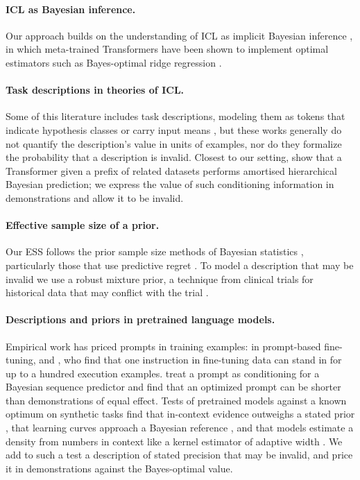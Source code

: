\documentclass[10pt]{article}
\begin{document}
\paragraph{ICL as Bayesian inference.} Our approach builds on the understanding of ICL as implicit Bayesian inference \citep{xie2022}, in which meta-trained Transformers have been shown to implement optimal estimators such as Bayes-optimal ridge regression \citep{akyurek2023, raventos2023, panwar2024}.

\paragraph{Task descriptions in theories of ICL.} Some of this literature includes task descriptions, modeling them as tokens that indicate hypothesis classes or carry input means \citep{huangge2025, lin2025, tong2026, lin2024}, but these works generally do not quantify the description's value in units of examples, nor do they formalize the probability that a description is invalid. Closest to our setting, \citet{zhu2026} show that a Transformer given a prefix of related datasets performs amortised hierarchical Bayesian prediction; we express the value of such conditioning information in demonstrations and allow it to be invalid.

\paragraph{Effective sample size of a prior.} Our ESS follows the prior sample size methods of Bayesian statistics \citep{morita2008, reimherr2021, neuenschwander2020}, particularly those that use predictive regret \citep{reznik2026}. To model a description that may be invalid we use a robust mixture prior, a technique from clinical trials for historical data that may conflict with the trial \citep{schmidli2014}.

\paragraph{Descriptions and priors in pretrained language models.} Empirical work has priced prompts in training examples: \citet{lescao2021} in prompt-based fine-tuning, and \citet{cook2026}, who find that one instruction in fine-tuning data can stand in for up to a hundred execution examples. \citet{wenliang2025} treat a prompt as conditioning for a Bayesian sequence predictor and find that an optimized prompt can be shorter than demonstrations of equal effect. Tests of pretrained models against a known optimum on synthetic tasks find that in-context evidence outweighs a stated prior \citep{gupta2025}, that learning curves approach a Bayesian reference \citep{akata2026}, and that models estimate a density from numbers in context like a kernel estimator of adaptive width \citep{liu2025}. We add to such a test a description of stated precision that may be invalid, and price it in demonstrations against the Bayes-optimal value.
\end{document}
